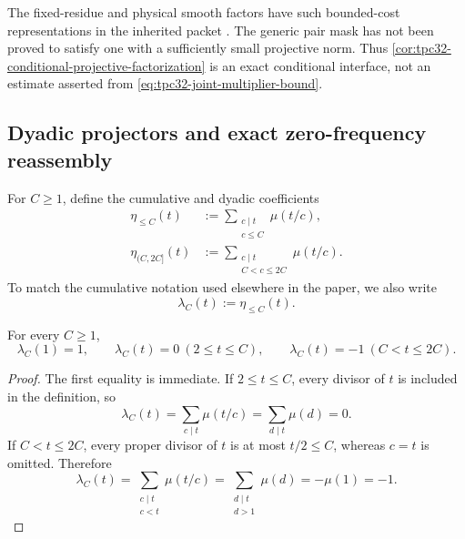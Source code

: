 The fixed-residue and physical smooth factors have such bounded-cost
representations in the inherited packet \citep{WangTPC25}.  The
generic pair mask has not been proved to satisfy one with a sufficiently
small projective norm.  Thus
\cref{cor:tpc32-conditional-projective-factorization} is an exact
conditional interface, not an estimate asserted from
\eqref{eq:tpc32-joint-multiplier-bound}.

\subsection{Dyadic projectors and exact zero-frequency reassembly}

For \(C\ge1\), define the cumulative and dyadic coefficients
\begin{align}
 \eta_{\le C}(t)
 &:=\sum_{\substack{c\mid t\\c\le C}}\mu(t/c),
 \label{eq:tpc32-cumulative-projector}\\
 \eta_{(C,2C]}(t)
 &:=\sum_{\substack{c\mid t\\C<c\le2C}}\mu(t/c).
 \label{eq:tpc32-dyadic-projector}
\end{align}
To match the cumulative notation used elsewhere in the paper, we also
write
\begin{equation}
 \lambda_C(t):=\eta_{\le C}(t).
 \label{eq:tpc32-lambda-projector-alias}
\end{equation}

\begin{lemma}
\label{lem:tpc32-first-dyadic-projector-band}
For every \(C\ge1\),
\begin{equation}
 \boxed{
 \lambda_C(1)=1,\qquad
 \lambda_C(t)=0\ (2\le t\le C),\qquad
 \lambda_C(t)=-1\ (C<t\le2C).}
 \label{eq:tpc32-first-dyadic-projector-band}
\end{equation}
\end{lemma}

\begin{proof}
The first equality is immediate.  If \(2\le t\le C\), every divisor of
\(t\) is included in the definition, so
\[
 \lambda_C(t)=\sum_{c\mid t}\mu(t/c)
 =\sum_{d\mid t}\mu(d)=0.
\]
If \(C<t\le2C\), every proper divisor of \(t\) is at most \(t/2\le C\),
whereas \(c=t\) is omitted.  Therefore
\[
 \lambda_C(t)=\sum_{\substack{c\mid t\\c<t}}\mu(t/c)
 =\sum_{\substack{d\mid t\\d>1}}\mu(d)
 =-\mu(1)=-1.
\]
\end{proof}

